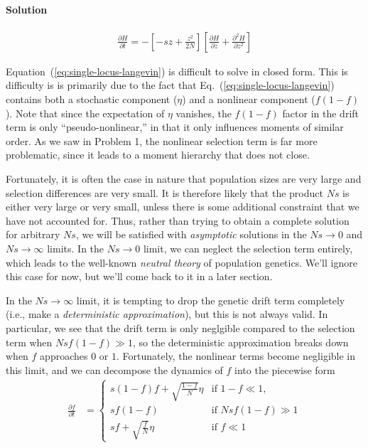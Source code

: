 \documentclass[11pt]{article}
\newcommand{\eq}[1]{Eq.~(\ref{#1})}
\newcommand{\Eq}[1]{Equation~(\ref{#1})}
\begin{document}
\paragraph{Solution}
\begin{align}
\frac{\partial H}{\partial t} = - \left[ - s z + \frac{z^2}{2N} \right] \left[ \frac{\partial H}{\partial z} + \frac{\partial^2 H}{\partial z^2} \right] 
\end{align}

\noindent \Eq{eq:single-locus-langevin} is difficult to solve in closed form. This is difficulty is is primarily due to the fact that \eq{eq:single-locus-langevin} contains both a stochastic component ($\eta$) and a nonlinear component ($f(1-f)$). Note that since the expectation of $\eta$ vanishes, the $f(1-f)$ factor in the drift term is only ``pseudo-nonlinear,'' in that it only influences moments of similar order. As we saw in Problem 1, the nonlinear selection term is far more problematic, since it leads to a moment hierarchy that does not close.

Fortunately, it is often the case in nature that population sizes are very large and selection differences are very small. It is therefore likely that the product $Ns$ is either very large or very small, unless there is some additional constraint that we have not accounted for. Thus, rather than trying to obtain a complete solution for arbitrary $Ns$, we will be satisfied with \emph{asymptotic} solutions in the $Ns \to 0$ and $Ns \to \infty$ limits. In the $Ns \to 0$ limit, we can neglect the selection term entirely, which leads to the well-known \emph{neutral theory} of population genetics. We'll ignore this case for now, but we'll come back to it in a later section.

In the $Ns \to \infty$ limit, it is tempting to drop the genetic drift term completely (i.e., make a \emph{deterministic approximation}), but this is not always valid. In particular, we see that the drift term is only neglgible compared to the selection term when $Ns f(1-f) \gg 1$, so the deterministic approximation breaks down when $f$ approaches $0$ or $1$. Fortunately, the nonlinear terms become negligible in this limit, and we can decompose the dynamics of $f$ into the piecewise form
\begin{align}
\frac{\partial f}{\partial t} & = \begin{cases}
s(1-f) f + \sqrt{\frac{1-f}{N}} \eta & \text{if $1-f \ll 1$,} \\
s f(1-f) & \text{if $Ns f(1-f) \gg 1$} \\
s f + \sqrt{\frac{f}{N}} \eta & \text{if $f \ll 1$}
\end{cases}
\end{align}
\end{document}
